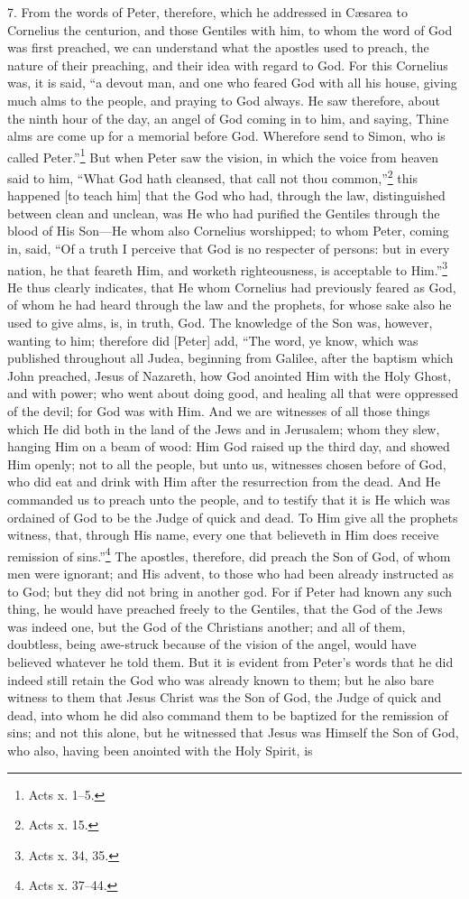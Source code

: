 7. From the words of Peter, therefore, which he addressed in Cæsarea to Cornelius the centurion, and those Gentiles with him, to whom the word of God was first preached, we can understand what the apostles used to preach, the nature of their preaching, and their idea with regard to God. For this Cornelius was, it is said, “a devout man, and one who feared God with all his house, giving much alms to the people, and praying to God always. He saw therefore, about the ninth hour of the day, an angel of God coming in to him, and saying, Thine alms are come up for a memorial before God. Wherefore send to Simon, who is called Peter.”\footnote{Acts x. 1–5.} But when Peter saw the vision, in which the voice from heaven said to him, “What God hath cleansed, that call not thou common,”\footnote{Acts x. 15.} this happened [to teach him] that the God who had, through the law, distinguished between clean and unclean, was He who had purified the Gentiles through the blood of His Son—He whom also Cornelius worshipped; to whom Peter, coming in, said, “Of a truth I perceive that God is no respecter of persons: but in every nation, he that feareth Him, and worketh righteousness, is acceptable to Him.”\footnote{Acts x. 34, 35.} He thus clearly indicates, that He whom Cornelius had previously feared as God, of whom he had heard through the law and the prophets, for whose sake also he used to give alms, is, in truth, God. The knowledge of the Son was, however, wanting to him; therefore did [Peter] add, “The word, ye know, which was published throughout all Judea, beginning from Galilee, after the baptism which John preached, Jesus of Nazareth, how God anointed Him with the Holy Ghost, and with power; who went about doing good, and healing all that were oppressed of the devil; for God was with Him. And we are witnesses of all those things which He did both in the land of the Jews and in Jerusalem; whom they slew, hanging Him on a beam of wood: Him God raised up the third day, and showed Him openly; not to all the people, but unto us, witnesses chosen before of God, who did eat and drink with Him after the resurrection from the dead. And He commanded us to preach unto the people, and to testify that it is He which was ordained of God to be the Judge of quick and dead. To Him give all the prophets witness, that, through His name, every one that believeth in Him does receive remission of sins.”\footnote{Acts x. 37–44.} The apostles, therefore, did preach the Son of God, of whom men were ignorant; and His advent, to those  who had been already instructed as to God; but they did not bring in another god. For if Peter had known any such thing, he would have preached freely to the Gentiles, that the God of the Jews was indeed one, but the God of the Christians another; and all of them, doubtless, being awe-struck because of the vision of the angel, would have believed whatever he told them. But it is evident from Peter’s words that he did indeed still retain the God who was already known to them; but he also bare witness to them that Jesus Christ was the Son of God, the Judge of quick and dead, into whom he did also command them to be baptized for the remission of sins; and not this alone, but he witnessed that Jesus was Himself the Son of God, who also, having been anointed with the Holy Spirit, is 